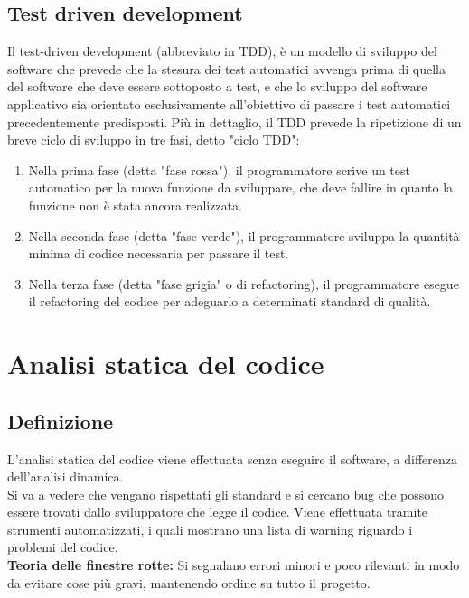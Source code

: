 \documentclass[10pt, a4paper]{article}
\begin{document}
\subsection{Test driven development}
Il test-driven development (abbreviato in TDD), è un modello di sviluppo del software che prevede
che la stesura dei test automatici avvenga prima di quella del software che deve essere sottoposto
a test, e che lo sviluppo del software applicativo sia orientato esclusivamente all'obiettivo di
passare i test automatici precedentemente predisposti.
Più in dettaglio, il TDD prevede la ripetizione di un breve ciclo di sviluppo in tre fasi, detto "ciclo TDD":
\begin{enumerate}
\item Nella prima fase (detta "fase rossa"), il programmatore scrive un test automatico per la nuova
funzione da sviluppare, che deve fallire in quanto la funzione non è stata ancora realizzata.
\item Nella seconda fase (detta "fase verde"), il programmatore sviluppa la quantità minima di codice
necessaria per passare il test.
\item Nella terza fase (detta "fase grigia" o di refactoring), il programmatore esegue il refactoring del codice per adeguarlo a determinati standard di qualità.
\end{enumerate}

\section{Analisi statica del codice}
\subsection{Definizione}
L'analisi statica del codice viene effettuata senza eseguire il software, a differenza dell'analisi dinamica.\\
Si va a vedere che vengano rispettati gli standard e si cercano bug che possono essere trovati dallo sviluppatore che legge il codice. Viene effettuata tramite strumenti automatizzati, i quali mostrano una lista di warning riguardo i problemi del codice.\\
\textbf{Teoria delle finestre rotte:} Si segnalano errori minori e poco rilevanti in modo da evitare cose più gravi, mantenendo ordine su tutto il progetto.
\end{document}
